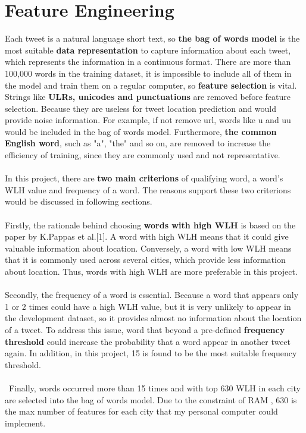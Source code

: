 \documentclass[11pt]{article}
\begin{document}
\section{Feature Engineering}
Each tweet is a natural language short text, so \textbf{ the bag of words model} is the most suitable \textbf{data representation} to capture information about each tweet, which represents the information in a continuous format. 
\newline\newline
There are more than 100,000 words in the training dataset, it is impossible to include all of them in the model and train them on a regular computer, so\textbf{ feature selection} is vital. Strings like\textbf{ ULRs, unicodes and punctuations} are removed before feature selection. Because they are useless for tweet location prediction and would provide noise information. For example, if not remove url, words like u and uu would be included in the bag of words model. Furthermore,\textbf{ the common English word}, such as "a", "the" and so on, are removed to increase the efficiency of training, since they are commonly used and not representative.\\\\
In this project, there are\textbf{ two main criterions} of qualifying word, a word's WLH value and frequency of a word. The reasons support these two criterions would be discussed in following sections.\\\\
Firstly, the rationale behind choosing\textbf{ words with high WLH} is based on the paper by K.Pappas et al.[1]. A word with high WLH means that it could give valuable information about location. Conversely, a word with low WLH means that it is commonly used across several cities, which provide less information about location. Thus, words with high WLH are more preferable in this project.\\\\
Secondly, the frequency of a word is essential. Because a word that appears only 1 or 2 times could have a high WLH value, but it is very unlikely to appear in the development dataset, so it provides almost no information about the location of a tweet. To address this issue, word that beyond a pre-defined\textbf{ frequency threshold} could increase the probability that a word appear in another tweet again. In addition, in this project, 15 is found to be the most suitable frequency threshold.\\\\\
Finally, words occurred more than 15 times and with top 630 WLH in each city are selected into the bag of words model. Due to the constraint of RAM , 630 is the max number of features for each city that my personal computer could implement.
\end{document}
